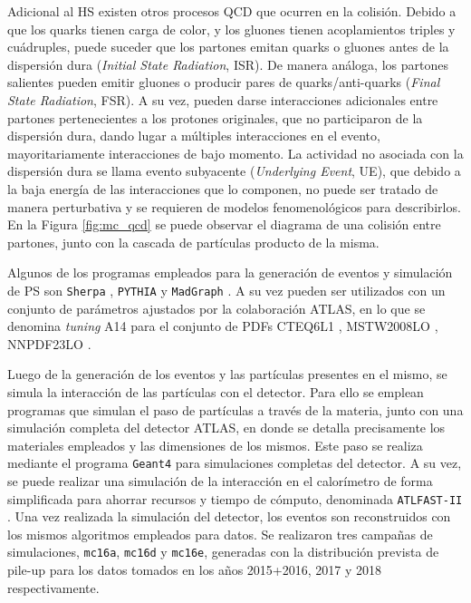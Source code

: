 Adicional al HS existen otros procesos QCD que ocurren en la colisión. Debido a que los quarks tienen carga de color, y los gluones tienen acoplamientos triples y cuádruples, puede suceder que los partones emitan quarks o gluones antes de la dispersión dura (\textit{Initial State Radiation}, ISR). De manera análoga, los partones salientes pueden emitir gluones o
producir pares de quarks/anti-quarks (\textit{Final State Radiation}, FSR). A su vez, pueden darse interacciones adicionales entre partones pertenecientes a los protones originales, que no participaron de la dispersión dura, dando lugar a múltiples
interacciones en el evento, mayoritariamente interacciones de bajo momento. La actividad no asociada con la dispersión dura se llama evento subyacente
(\textit{Underlying Event}, UE), que debido a la baja energía de las interacciones que lo
componen, no puede ser tratado de manera perturbativa y se requieren de modelos
fenomenológicos para describirlos. En la Figura \ref{fig:mc_qcd} se puede observar el diagrama de una colisión entre partones, junto con la cascada de partículas producto de la misma.


Algunos de los programas empleados para la generación de eventos y simulación de PS son \texttt{Sherpa} \cite{SherpaGen, Schumann:2007mg, Bothmann:2019yzt}, \texttt{PYTHIA} \cite{Sjostrand:2014zea} y \texttt{MadGraph} \cite{Alwall:2014hca}. A su vez pueden ser utilizados con un conjunto de parámetros ajustados por la colaboración ATLAS, en lo que se denomina \textit{tuning} A14 \cite{ATL-PHYS-PUB-2014-021} para el conjunto de PDFs CTEQ6L1 \cite{Pumplin:2002vw}, MSTW2008LO \cite{Martin:2009iq, Martin:2009bu, Martin_2010}, NNPDF23LO \cite{Ball:2012cx,Ball:2014uwa}. 


Luego de la generación de los eventos y las partículas presentes en el mismo, se simula la interacción de las partículas con el detector. 
Para ello se emplean programas que simulan el paso de partículas a través de la materia, junto con una simulación completa del detector ATLAS, en donde se detalla precisamente los materiales empleados y las dimensiones de los mismos. Este paso se realiza mediante el programa \texttt{Geant4} \cite{Geant4} para simulaciones completas del detector. A su vez, se puede realizar una simulación de la interacción en el calorímetro de forma simplificada para ahorrar recursos y tiempo de cómputo, denominada \texttt{ATLFAST-II} \cite{Richter-Was:683751,Lukas_2012}. Una vez realizada la simulación del detector, los eventos son reconstruidos con los mismos algoritmos empleados para datos. Se realizaron tres campañas de simulaciones, \texttt{mc16a}, \texttt{mc16d} y \texttt{mc16e}, generadas con la distribución prevista de pile-up para los datos tomados en los años 2015+2016, 2017 y 2018 respectivamente.




